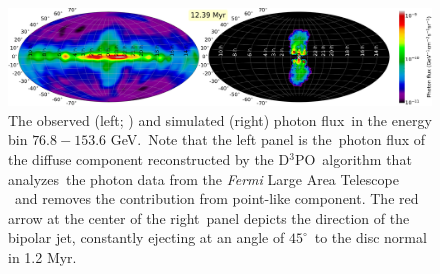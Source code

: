 \documentclass[twocolumn]{aastex631}
\begin{document}





\begin{figure}
  \includegraphics[width=\linewidth]{figures/fig__GammaRay_100e9_1e6_angle_000.png}
  \caption{The observed (left; \citealt{Selig2015}) and simulated (right) photon flux\
           in the energy bin $76.8-153.6$ GeV.\
           Note that the left panel is the\
           photon flux of the diffuse component reconstructed by the D$^3$PO\
           algorithm \citep{Selig2015} that analyzes\
           the photon data from the \textit{Fermi} Large Area Telescope \citep{Atwood2009}\
           and removes the contribution from point-like component.
           The red arrow at the center of the right\
           panel depicts the direction of the bipolar jet, constantly ejecting at an angle of $45^{\circ}$\
           to the disc normal in 1.2 Myr.
  }
  \label{fig__gammaRay-map}
\end{figure}
\end{document}
